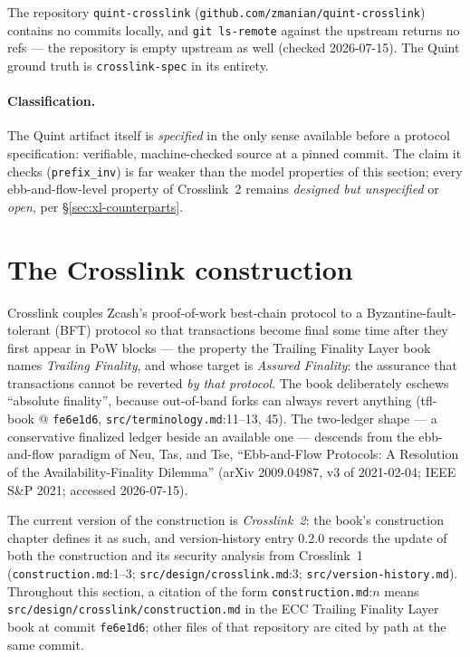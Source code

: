 \documentclass[11pt,a4paper]{article}
\theoremstyle{definition}
\begin{document}
The repository \texttt{quint-crosslink}
(\texttt{github.com/zmanian/quint-crosslink}) contains no commits locally,
and \texttt{git ls-remote} against the upstream returns no refs --- the
repository is empty upstream as well (checked 2026-07-15). The Quint
ground truth is \texttt{crosslink-spec} in its entirety.

\paragraph{Classification.} The Quint artifact itself is
\emph{specified} in the only sense available before a protocol
specification: verifiable, machine-checked source at a pinned commit. The
claim it checks (\texttt{prefix\_inv}) is far weaker than the model
properties of this section; every ebb-and-flow-level property of
Crosslink~2 remains \emph{designed but unspecified} or \emph{open}, per
\S\ref{sec:xl-counterparts}.

\section{The Crosslink construction}\label{sec:xl-construction}

Crosslink couples Zcash's proof-of-work best-chain protocol to a
Byzantine-fault-tolerant (BFT) protocol so that transactions become final
some time after they first appear in PoW blocks --- the property the
Trailing Finality Layer book names \emph{Trailing Finality}, and whose
target is \emph{Assured Finality}: the assurance that transactions cannot
be reverted \emph{by that protocol}. The book deliberately eschews
``absolute finality'', because out-of-band forks can always revert
anything (tfl-book @ \texttt{fe6e1d6}, \texttt{src/terminology.md}:11--13,
45). The two-ledger shape --- a conservative finalized ledger beside an
available one --- descends from the ebb-and-flow paradigm of Neu, Tas, and
Tse, ``Ebb-and-Flow Protocols: A Resolution of the Availability-Finality
Dilemma'' (arXiv 2009.04987, v3 of 2021-02-04; IEEE S\&P 2021; accessed
2026-07-15).

The current version of the construction is \emph{Crosslink~2}: the book's
construction chapter defines it as such, and version-history entry 0.2.0
records the update of both the construction and its security analysis from
Crosslink~1 (\texttt{construction.md}:1--3;
\texttt{src/design/crosslink.md}:3; \texttt{src/version-history.md}).
Throughout this section, a citation of the form \texttt{construction.md}:$n$
means \texttt{src/design/crosslink/construction.md} in the ECC Trailing
Finality Layer book at commit \texttt{fe6e1d6}; other files of that
repository are cited by path at the same commit.
\end{document}
